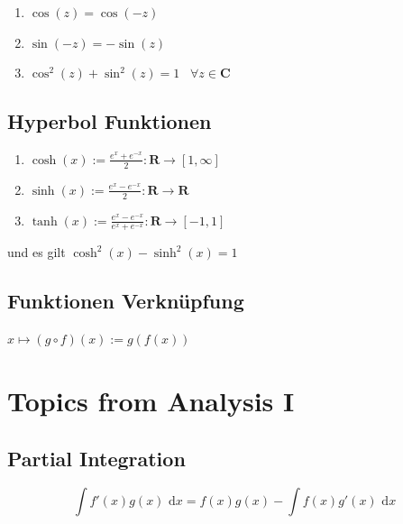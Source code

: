 \documentclass[8pt]{extarticle}
\def\dx{\text{ d}x}
\def\dx{\text{ d}x}
\begin{document}
\begin{multicols*}{3}
\begin{center}
\end{center}

\begin{enumerate}
  \item $\cos(z) = \cos(-z)$
  \item $\sin(-z) = -\sin(z)$
  \item $\cos^2(z) + \sin^2(z) = 1 \;\;\; \forall z \in \mathbf{C}$
\end{enumerate}


\subsection{Hyperbol Funktionen}

\begin{enumerate}
  \item $\cosh(x) := \frac{e^x + e^{-x}}{2}: \mathbf{R} \rightarrow [1, \infty]$
  \item $\sinh(x) := \frac{e^x - e^{-x}}{2}: \mathbf{R} \rightarrow \mathbf{R}$
  \item $\tanh(x) := \frac{e^x - e^{-x}}{e^x + e^{-x}}: \mathbf{R} \rightarrow [-1, 1]$
\end{enumerate}
und es gilt $\cosh^2(x) - \sinh^2(x) = 1$



\subsection{Funktionen Verknüpfung}

$
x \mapsto (g \circ f)(x) := g(f(x))
$
%

\section{Topics from Analysis I}
\subsection{Partial Integration}
 $$\int f'(x) g(x) \dx = f(x)g(x) - \int f(x) g'(x) \dx$$

\end{multicols*}
\end{document}
